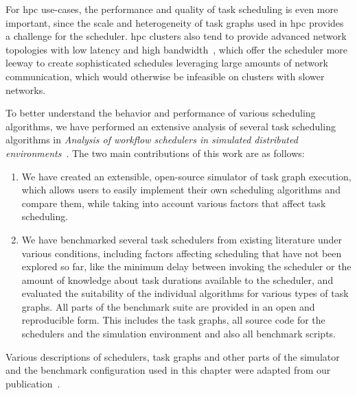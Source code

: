 For \gls{hpc} use-cases, the performance and quality of task scheduling is even more
important, since the scale and heterogeneity of task graphs used in \gls{hpc} provides
a challenge for the scheduler. \gls{hpc} clusters also tend to provide advanced
network topologies with low latency and high bandwidth~\cite{dragonfly,slimfly}, which offer the
scheduler more leeway to create sophisticated schedules leveraging large amounts of network
communication, which would otherwise be infeasible on clusters with slower networks.

To better understand the behavior and performance of various scheduling algorithms, we have
performed an extensive analysis of several task scheduling algorithms in
\emph{Analysis of workflow schedulers in simulated distributed environments}~\cite{estee}. The two main contributions of this work are as
follows:
\begin{enumerate}
	\item We have created an extensible, open-source simulator of task graph execution, which allows users to
	      easily implement their own scheduling algorithms and compare them, while taking into account
	      various factors that affect task scheduling.
	\item We have benchmarked several task schedulers from existing literature under various conditions,
	      including factors affecting scheduling that have not been explored so far, like the minimum delay
	      between invoking the scheduler or the amount of knowledge about task durations available to the
	      scheduler, and evaluated the suitability of the individual algorithms for various types of task
	      graphs. All parts of the benchmark suite are provided in an open and reproducible form. This
	      includes the task graphs, all source code for the schedulers and the simulation environment and
	      also all benchmark scripts.
\end{enumerate}

Various descriptions of schedulers, task graphs and other parts of the simulator and the benchmark
configuration used in this chapter were adapted from our publication~\cite{estee}.



